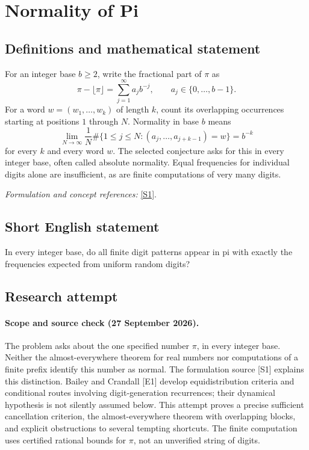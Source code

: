 \documentclass[11pt]{article}
\begin{document}
\section*{\texorpdfstring{Normality of Pi}{Normality of Pi}}\label{471}
\subsection{Definitions and mathematical statement}
For an integer base $b\ge2$, write the fractional part of $\pi$ as
\[
 \pi-\lfloor\pi\rfloor=\sum_{j=1}^{\infty}a_jb^{-j},
 \qquad a_j\in\{0,\ldots,b-1\}.
\]
For a word $w=(w_1,\ldots,w_k)$ of length $k$, count its overlapping occurrences starting at positions $1$ through $N$. Normality in base $b$ means
\[
 \lim_{N\to\infty}\frac1N
 \#\{1\le j\le N:(a_j,\ldots,a_{j+k-1})=w\}=b^{-k}
\]
for every $k$ and every word $w$. The selected conjecture asks for this in every integer base, often called absolute normality. Equal frequencies for individual digits alone are insufficient, as are finite computations of very many digits.
\par\smallskip\textit{Formulation and concept references:} \href{https://www.claymath.org/library/annual_report/ar2006/06report_normalnumbers.pdf}{[S1]}.

\subsection{Short English statement}
In every integer base, do all finite digit patterns appear in pi with exactly the frequencies expected from uniform random digits?
\subsection{Research attempt}
\paragraph{Scope and source check (27 September 2026).}
The problem asks about the one specified number $\pi$, in every integer base. Neither the almost-everywhere theorem for real numbers nor computations of a finite prefix identify this number as normal. The formulation source [S1] explains this distinction. Bailey and Crandall [E1] develop equidistribution criteria and conditional routes involving digit-generation recurrences; their dynamical hypothesis is not silently assumed below. This attempt proves a precise sufficient cancellation criterion, the almost-everywhere theorem with overlapping blocks, and explicit obstructions to several tempting shortcuts. The finite computation uses certified rational bounds for $\pi$, not an unverified string of digits.
\end{document}
